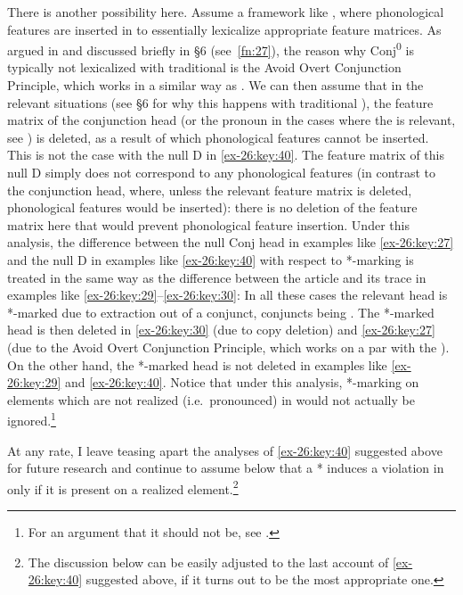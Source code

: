 \documentclass[output=paper]{langsci/langscibook}
\begin{document}
There is another possibility here. Assume a framework like , where phonological features are inserted in  to
essentially lexicalize appropriate feature matrices. As argued in
\textcite{Progovac1998,Progovac1999} and discussed briefly in §6
(see~\cref{fn:27}), the reason why Conj\textsuperscript{0} is typically not
lexicalized with traditional  is the Avoid Overt Conjunction
Principle, which works in a similar way as  . We can then assume that in the relevant situations (see §6 for why
this happens with traditional ), the feature matrix of the
conjunction head (or the pronoun in the cases where the  is relevant, see \citealt{Holmberg2005}) is deleted, as a
result of which phonological features cannot be inserted. This is not the case
with the null D in \eqref{ex-26:key:40}. The feature matrix of this null D simply does not
correspond to any phonological features (in contrast to the conjunction head,
where, unless the relevant feature matrix is deleted, phonological features
would be inserted): there is no deletion of the feature matrix here that would
prevent phonological feature insertion.  Under this analysis, the difference
between the null Conj head in examples like \eqref{ex-26:key:27} and the null D in examples
like \eqref{ex-26:key:40} with respect to *-marking is treated in the same way as the
difference between the article and its trace in  examples like
\eqref{ex-26:key:29}--\eqref{ex-26:key:30}: In all these cases the relevant head is *-marked due to extraction
out of a conjunct, conjuncts being .  The *-marked head is then deleted
in \eqref{ex-26:key:30} (due to copy deletion) and \eqref{ex-26:key:27} (due to the Avoid Overt Conjunction
Principle, which works on a par with the ).  On
the other hand, the *-marked head is not deleted in examples like \eqref{ex-26:key:29} and
\eqref{ex-26:key:40}.  Notice that under this analysis, *-marking on elements which are not
realized (i.e.\ pronounced) in  would not actually be
ignored.\footnote{For an argument that it should not be, see
\textcite{Boskovic2011}.}

At any rate, I leave teasing apart the analyses of \eqref{ex-26:key:40} suggested above for
future research and continue to assume below that a * induces a violation in
 only if it is present on a  realized
element.\footnote{The discussion below can be easily adjusted to the last
account of \eqref{ex-26:key:40} suggested above, if it turns out to be the most appropriate
one.}
\end{document}

